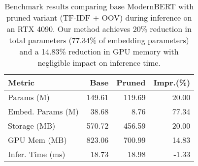 \begin{table}[htb]
\centering
\scriptsize
\setlength{\tabcolsep}{3pt}
\begin{tabular}{lrrr}
\toprule
\textbf{Metric} & \textbf{Base} & \textbf{Pruned} & \textbf{Impr.(\%)} \\
\midrule
Params (M) & 149.61 & 119.69 & 20.00 \\
Embed. Params (M) & 38.68 & 8.76 & 77.34 \\
Storage (MB) & 570.72 & 456.59 & 20.00 \\
GPU Mem (MB) & 823.06 & 700.99 & 14.83 \\
Infer. Time (ms) & 18.73 & 18.98 & -1.33 \\
\bottomrule
\end{tabular}
\caption{Benchmark results comparing base ModernBERT with pruned variant (TF-IDF + OOV) during inference on an RTX 4090. Our method achieves 20\% reduction in total parameters (77.34\% of embedding parameters) and a 14.83\% reduction in GPU memory with negligible impact on inference time.}

\label{tab:benchmark_results}
\end{table} 